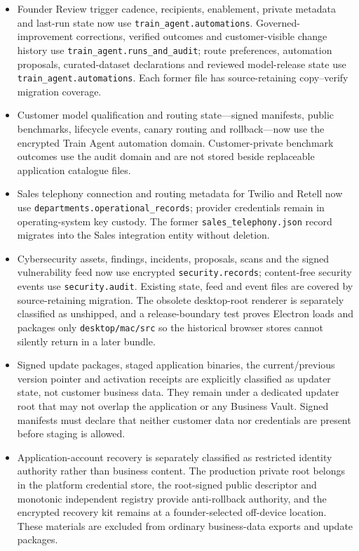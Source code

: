 \documentclass[11pt]{article}
\begin{document}
\begin{itemize}
  \item Founder Review trigger cadence, recipients, enablement, private metadata and last-run state now use \texttt{train\_agent.automations}. Governed-improvement corrections, verified outcomes and customer-visible change history use \texttt{train\_agent.runs\_and\_audit}; route preferences, automation proposals, curated-dataset declarations and reviewed model-release state use \texttt{train\_agent.automations}. Each former file has source-retaining copy--verify migration coverage.
  \item Customer model qualification and routing state---signed manifests, public benchmarks, lifecycle events, canary routing and rollback---now use the encrypted Train Agent automation domain. Customer-private benchmark outcomes use the audit domain and are not stored beside replaceable application catalogue files.
  \item Sales telephony connection and routing metadata for Twilio and Retell now use \texttt{departments.operational\_records}; provider credentials remain in operating-system key custody. The former \texttt{sales\_telephony.json} record migrates into the Sales integration entity without deletion.
  \item Cybersecurity assets, findings, incidents, proposals, scans and the signed vulnerability feed now use encrypted \texttt{security.records}; content-free security events use \texttt{security.audit}. Existing state, feed and event files are covered by source-retaining migration. The obsolete desktop-root renderer is separately classified as unshipped, and a release-boundary test proves Electron loads and packages only \texttt{desktop/mac/src} so the historical browser stores cannot silently return in a later bundle.
  \item Signed update packages, staged application binaries, the current/previous version pointer and activation receipts are explicitly classified as updater state, not customer business data. They remain under a dedicated updater root that may not overlap the application or any Business Vault. Signed manifests must declare that neither customer data nor credentials are present before staging is allowed.
  \item Application-account recovery is separately classified as restricted identity authority rather than business content. The production private root belongs in the platform credential store, the root-signed public descriptor and monotonic independent registry provide anti-rollback authority, and the encrypted recovery kit remains at a founder-selected off-device location. These materials are excluded from ordinary business-data exports and update packages.

\end{itemize}
\end{document}
